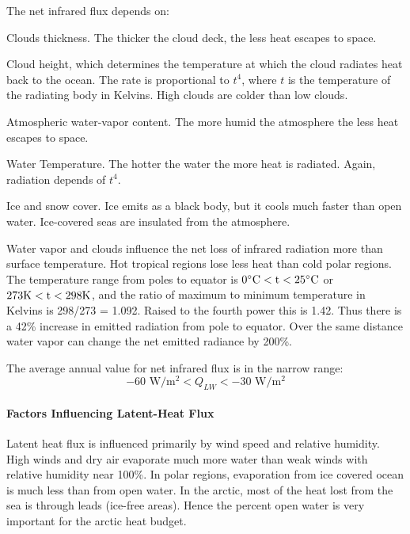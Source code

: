 The net infrared flux depends on:
\begin{enumerate}
\vitem Clouds thickness. The thicker the cloud deck, the less heat
escapes to space.

\vitem Cloud height, which determines the temperature at which the
cloud radiates heat back to the ocean. The rate is proportional to
$t^4$, where $t$ is the temperature of the radiating body in
Kelvins. High clouds are colder than low clouds.

\vitem Atmospheric water-vapor content. The more humid the atmosphere
the less heat escapes to space.

\vitem Water Temperature. The hotter the water the more heat is
radiated.  Again, radiation depends of $t^4$.

\vitem Ice and snow cover. Ice emits as a black body, but it cools
much faster than open water. Ice-covered seas are insulated from the
atmosphere.
\end{enumerate}

Water vapor and clouds influence the net loss of infrared radiation
more than surface temperature. Hot tropical regions lose less heat
than cold polar regions. The temperature range from poles to equator
is $0^{\circ}\rm{C} < t < 25^{\circ}\rm{C}$ or $273\rm{K} < t <
298\rm{K}$, and the ratio of maximum to minimum temperature in Kelvins
is 298/273 = 1.092. Raised to the fourth power this is 1.42. Thus
there is a 42\% increase in emitted radiation from pole to
equator. Over the same distance water vapor can change the net emitted
radiance by 200\%.

The average annual value for net infrared flux is in the narrow range:
\begin{equation}
-60 \text{\ W/m$^2$} < Q_{LW} < -30 \text{\ W/m$^2$}
\end{equation}

\paragraph{Factors Influencing Latent-Heat Flux}
Latent heat flux is influenced primarily by
wind speed and relative humidity. High winds and dry air evaporate
much more water than weak winds with relative humidity near 100\%. In
polar regions, evaporation from ice covered ocean is much less than
from open water. In the arctic, most of the heat lost from the sea is
through leads (ice-free areas). Hence the percent open water is very
important for the arctic heat budget.

